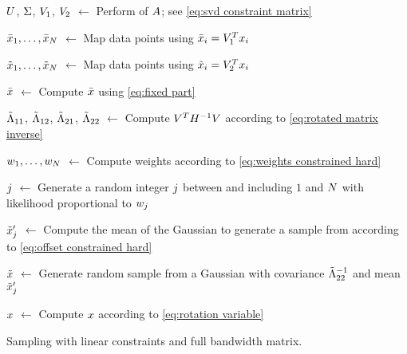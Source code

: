 \begin{algorithm}[t]
	
	$U$, $\Sigma$, $V_1$, $V_2$ $\gets$ Perform  of $A$; see \cref{eq:svd constraint matrix}
	
	$\bar{x}_{1},\ldots,\bar{x}_{N}$ $\gets$ Map data points using $\bar{x}_{i} = V_1^T x_{i}$
		
	$\tilde{x}_{1},\ldots,\tilde{x}_{N}$ $\gets$ Map data points using $\tilde{x}_{i} = V_2^T x_{i}$
	
	$\bar{x}$ $\gets$ Compute $\bar{x}$ using \cref{eq:fixed part}
	
	$\tilde{\Lambda}_{11}$, $\tilde{\Lambda}_{12}$, $\tilde{\Lambda}_{21}$, $\tilde{\Lambda}_{22}$ $\gets$ Compute $V^T H^{-1} V$ according to \cref{eq:rotated matrix inverse}
	
	$w_{1},\ldots,w_{N}$ $\gets$ Compute weights according to \cref{eq:weights constrained hard}
	
	$j$ $\gets$ Generate a random integer $j$ between and including $1$ and $N$ with likelihood proportional to $w_{j}$
	
	$\tilde{x}_{j}'$ $\gets$ Compute the mean of the Gaussian to generate a sample from according to \cref{eq:offset constrained hard}
	
	$\tilde{x}$ $\gets$ Generate random sample from a Gaussian with covariance $\tilde{\Lambda}_{22}^{-1}$ and mean $\tilde{x}_{j}'$
	
	$x$ $\gets$ Compute $x$ according to \cref{eq:rotation variable}
		
	\caption{Sampling with linear constraints and full bandwidth matrix.}
	\label{alg:constrained hard}
\end{algorithm}
